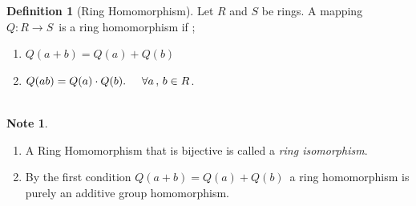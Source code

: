 \documentclass[11pt,a4paper]{article}
\theoremstyle{definition}
\newtheorem{defn}[thm]{Definition}
\newtheorem*{note}{Note}
\begin{document}
 
 


\begin{defn}[Ring Homomorphism]
Let $R$ and $S$ be rings. A mapping $Q : R\longrightarrow S\,$ is a ring homomorphism if ;
\begin{enumerate}
\item[] $Q(a + b) = Q(a) + Q(b)$
\item[] $Q(ab) = Q(a)\cdot Q(b).\hspace{0.5cm}\forall a\, , \, b\in R$.\\\\
\end{enumerate}
\end{defn}






\begin{note}
\begin{enumerate}
\item[•] A Ring Homomorphism that is bijective is called a \textit{ring isomorphism}.
\item[•] By the first condition $Q(a+b) = Q(a) + Q(b)\,$ a ring homomorphism is purely an additive group homomorphism.\\\\
\end{enumerate}
\end{note}
\end{document}
